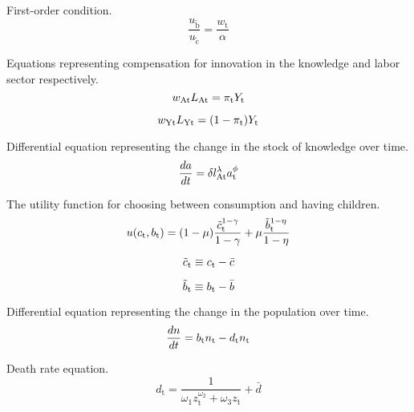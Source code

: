 \documentclass[letterpaper,12pt]{article}
\begin{document}
First-order condition.
\begin{equation} \label{eq:first_order_condition}
\frac{u_\mathrm{\tilde b}}{u_\mathrm{\tilde c}} = \frac{w_\mathrm{t}}{\alpha}
\end{equation}

Equations representing compensation for innovation in the knowledge and labor sector respectively.
\begin{equation} \title{eq:knowledge_comp}
w_\mathrm{At} L_\mathrm{At} = \pi_\mathrm{t} Y_\mathrm{t}
\end{equation}

\begin{equation} \title{labor_comp}
w_\mathrm{Yt} L_\mathrm{Yt} = (1-\pi_\mathrm{t})Y_\mathrm{t}
\end{equation}

Differential equation representing the change in the stock of knowledge over time.
\begin{equation} \title{eq:da_dt}
\frac{da}{dt} = \delta l_\mathrm{At}^\lambda a_\mathrm{t}^\phi
\end{equation}

The utility function for choosing between consumption and having children.
\begin{equation} \title{eq:utility}
u(c_\mathrm{t}, b_\mathrm{t}) = (1-\mu) \frac{\tilde c_\mathrm{t}^{1-\gamma}}{1-\gamma} + \mu \frac{\tilde b_\mathrm{t}^{1-\eta}}{1-\eta}
\end{equation}

\begin{equation} \title{eq:c_tilde}
\tilde c_\mathrm{t} \equiv c_\mathrm{t} - \bar c
\end{equation}

\begin{equation} \title{eq:b_tilde}
\tilde b_\mathrm{t} \equiv b_\mathrm{t} - \bar b
\end{equation}

Differential equation representing the change in the population over time.
\begin{equation} \title{dn_dt}
\frac{dn}{dt} = b_\mathrm{t} n_\mathrm{t} - d_\mathrm{t} n_\mathrm{t}
\end{equation}

Death rate equation.
\begin{equation}
d_\mathrm{t} = \frac{1}{\omega_\mathrm{1} z_\mathrm{t}^{\omega_\mathrm{2}} + \omega_\mathrm{3} z_\mathrm{t}} + \bar d
\end{equation}
\end{document}
